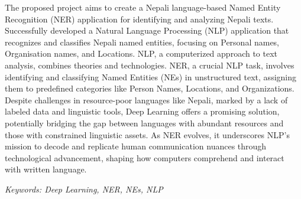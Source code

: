 The proposed project aims to create a Nepali language-based Named Entity Recognition (NER) application for identifying and analyzing Nepali texts. Successfully developed a Natural Language Processing (NLP) application that recognizes and classifies Nepali named entities, focusing on Personal names, Organisation names, and Locations. NLP, a computerized approach to text analysis, combines theories and technologies. NER, a crucial NLP task, involves identifying and classifying Named Entities (NEs) in unstructured text, assigning them to predefined categories like Person Names, Locations, and Organizations. Despite challenges in resource-poor languages like Nepali, marked by a lack of labeled data and linguistic tools, Deep Learning offers a promising solution, potentially bridging the gap between languages with abundant resources and those with constrained linguistic assets. As NER evolves, it underscores NLP's mission to decode and replicate human communication nuances through technological advancement, shaping how computers comprehend and interact with written language.



\par
\textit{Keywords: Deep Learning, NER,  NEs, NLP}
 
\newpage